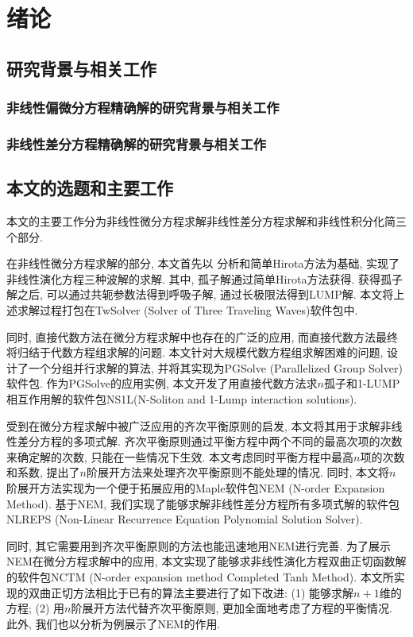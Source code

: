 \chapter{绪论} 
\section{研究背景与相关工作}
\subsection{非线性偏微分方程精确解的研究背景与相关工作}
\subsection{非线性差分方程精确解的研究背景与相关工作}
\section{本文的选题和主要工作}
本文的主要工作分为非线性微分方程求解\zdh 非线性差分方程求解和非线性积分化简三个部分.

在非线性微分方程求解的部分, 本文首先以\Painleve{} 分析和简单Hirota方法为基础, 实现了非线性演化方程三种波解的求解. 其中, 孤子解通过简单Hirota方法获得. 获得孤子解之后, 可以通过共轭参数法得到呼吸子解, 通过长极限法得到LUMP解. 本文将上述求解过程打包在TwSolver (Solver of Three Traveling Waves)软件包中. 

同时, 直接代数方法在微分方程求解中也存在的广泛的应用, 而直接代数方法最终将归结于代数方程组求解的问题. 本文针对大规模代数方程组求解困难的问题, 设计了一个分组并行求解的算法, 并将其实现为PGSolve (Parallelized Group Solver) 软件包. 作为PGSolve的应用实例, 本文开发了用直接代数方法求$n$孤子和1-LUMP相互作用解的软件包NS1L(N-Soliton and 1-Lump interaction solutions). 

受到在微分方程求解中被广泛应用的齐次平衡原则的启发, 本文将其用于求解非线性差分方程的多项式解. 齐次平衡原则通过平衡方程中两个不同的最高次项的次数来确定解的次数, 只能在一些情况下生效. 本文考虑同时平衡方程中最高$n$项的次数和系数, 提出了$n$阶展开方法来处理齐次平衡原则不能处理的情况. 同时, 本文将$n$阶展开方法实现为一个便于拓展应用的Maple软件包NEM (N-order Expansion Method). 基于NEM, 我们实现了能够求解非线性差分方程所有多项式解的软件包NLREPS (Non-Linear Recurrence Equation Polynomial Solution Solver). 

同时, 其它需要用到齐次平衡原则的方法也能迅速地用NEM进行完善. 为了展示NEM在微分方程求解中的应用, 本文实现了能够求非线性演化方程双曲正切函数解的软件包NCTM (N-order expansion method Completed Tanh Method). 本文所实现的双曲正切方法相比于已有的算法主要进行了如下改进: (1) 能够求解$n+1$维的方程; (2) 用$n$阶展开方法代替齐次平衡原则, 更加全面地考虑了方程的平衡情况. 此外, 我们也以\Painleve{}分析为例展示了NEM的作用. 

